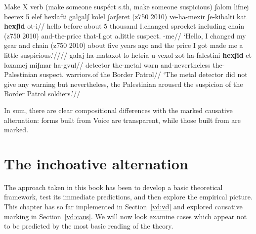\pex Make X verb (make someone suspéct s.th, make someone suspicious)
	\a \begingl
		\gla ʃalom lifnej beerex 5 elef hexlafti galgalʃ kolel ʃarʃeret (z750 2010) ve-ha-mexir ʃe-kibalti k{\texttslig}at \textbf{hexʃid} ot-i//
		\glb hello before about 5 thousand I.changed sprocket including chain (z750 2010) and-the-price that-I.got a.little suspect. -me//
		\glft `Hello, I changed my gear and chain (z750 2010) about five years ago and the price I got made me a little suspicious.'////
	\endgl
	\a \begingl
		\gla galaj ha-mataxot lo hetria u-{vexol zot} ha-falestini \textbf{hexʃid} et loxamej {miʃmar ha-gvul}//
		\glb detector the-metal  warn and-nevertheless the-Palestinian suspect.  warriors.of {the Border Patrol}//
		\glft `The metal detector did not give any warning but nevertheless, the Palestinian aroused the suspicion of the Border Patrol soldiers.'//
	\endgl
\xe

In sum, there are clear compositional differences with the marked causative alternation: forms built from Voice are transparent, while those built from {\vz} are marked.


%	
%	
%	
%


	



\section{The inchoative alternation} \label{vd:inch}
The approach taken in this book has been to develop a basic theoretical framework, test its immediate predictions, and then explore the empirical picture. This chapter has so far implemented {\vd} in Section~\ref{vd:vd} and explored causative marking in Section~\ref{vd:caus}. We will now look examine cases which appear not to be predicted by the most basic reading of the theory.

